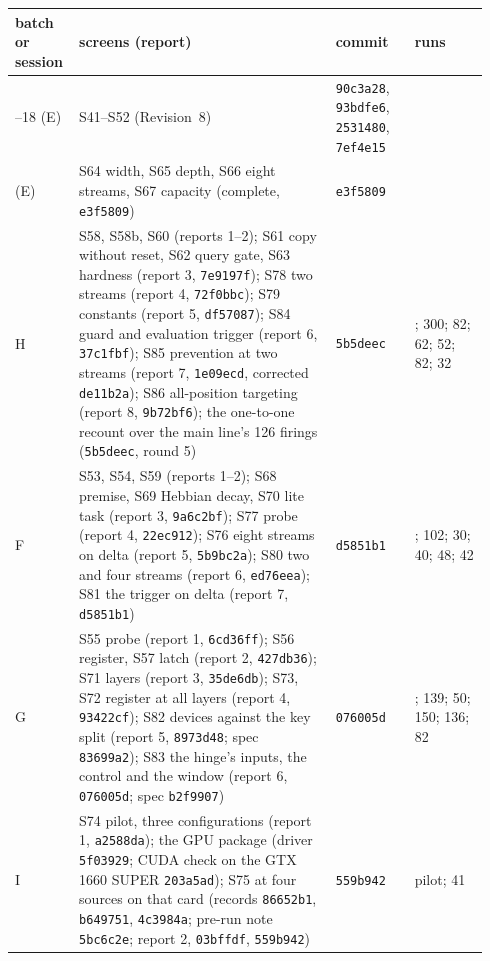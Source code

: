 \documentclass[11pt]{article}
\begin{document}
\begin{table}[H]
\centering
\footnotesize
\setlength{\tabcolsep}{3pt}
\begin{tabular}{@{}>{\raggedright\arraybackslash}p{0.11\linewidth}>{\raggedright\arraybackslash}p{0.52\linewidth}>{\raggedright\arraybackslash}p{0.16\linewidth}>{\raggedright\arraybackslash}p{0.15\linewidth}@{}}
\toprule
batch or session & screens (report) & commit & runs\\
\midrule
15--18 (E) & S41--S52 (Revision~8) & \texttt{90c3a28}, \texttt{93bdfe6}, \texttt{2531480}, \texttt{7ef4e15} & 379\\
19 (E) & S64 width, S65 depth, S66 eight streams, S67 capacity (complete, \texttt{e3f5809}) & \texttt{e3f5809} & 186\\
H & S58, S58b, S60 (reports 1--2); S61 copy without reset, S62 query gate, S63 hardness (report 3, \texttt{7e9197f}); S78 two streams (report 4, \texttt{72f0bbc}); S79 constants (report 5, \texttt{df57087}); S84 guard and evaluation trigger (report 6, \texttt{37c1fbf}); S85 prevention at two streams (report 7, \texttt{1e09ecd}, corrected \texttt{de11b2a}); S86 all-position targeting (report 8, \texttt{9b72bf6}); the one-to-one recount over the main line's 126 firings (\texttt{5b5deec}, round 5) & \texttt{5b5deec} & 318; 300; 82; 62; 52; 82; 32\\
F & S53, S54, S59 (reports 1--2); S68 premise, S69 Hebbian decay, S70 lite task (report 3, \texttt{9a6c2bf}); S77 probe (report 4, \texttt{22ec912}); S76 eight streams on delta (report 5, \texttt{5b9bc2a}); S80 two and four streams (report 6, \texttt{ed76eea}); S81 the trigger on delta (report 7, \texttt{d5851b1}) & \texttt{d5851b1} & 322; 102; 30; 40; 48; 42\\
G & S55 probe (report 1, \texttt{6cd36ff}); S56 register, S57 latch (report 2, \texttt{427db36}); S71 layers (report 3, \texttt{35de6db}); S73, S72 register at all layers (report 4, \texttt{93422cf}); S82 devices against the key split (report 5, \texttt{8973d48}; spec \texttt{83699a2}); S83 the hinge's inputs, the control and the window (report 6, \texttt{076005d}; spec \texttt{b2f9907}) & \texttt{076005d} & 22; 139; 50; 150; 136; 82\\
I & S74 pilot, three configurations (report 1, \texttt{a2588da}); the GPU package (driver \texttt{5f03929}; CUDA check on the GTX 1660 SUPER \texttt{203a5ad}); S75 at four sources on that card (records \texttt{86652b1}, \texttt{b649751}, \texttt{4c3984a}; pre-run note \texttt{5bc6c2e}; report 2, \texttt{03bffdf}, \texttt{559b942}) & \texttt{559b942} & pilot; 41\\

\end{tabular}
\end{table}
\end{document}
